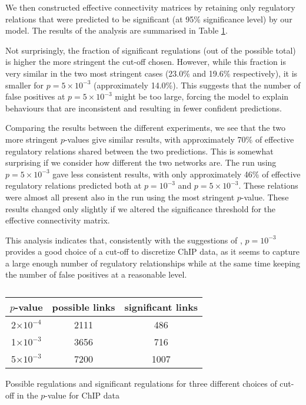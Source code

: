 \documentclass[english]{sheftech}
\begin{document}
We then constructed effective connectivity matrices by retaining only
regulatory relations that were predicted to be significant (at 95\%
significance level) by our model. The results of the analysis are
summarised in Table \ref{pVals}.

Not surprisingly, the fraction of significant regulations (out of
the possible total) is higher the more stringent the cut-off chosen.
However, while this fraction is very similar in the two most stringent
cases (23.0\% and 19.6\% respectively), it is smaller 
for $p=5\times10^{-3}$ (approximately
14.0\%). This suggests that the number of false positives at $p=5\times10^{-3}$
might be too large, forcing the model to explain behaviours that are
inconsistent and resulting in fewer confident predictions.

Comparing the results between the different experiments, we see that the
two more stringent $p$-values give similar results, with approximately
70\% of effective regulatory relations shared between the two predictions. 
This is somewhat surprising if we consider how different the two networks are. 
The run using $p=5\times10^{-3}$ gave less consistent results, with
only approximately 46\% of effective regulatory relations predicted
both at $p=10^{-3}$ and $p=5\times10^{-3}$. These relations were
almost all present also in the run using the most stringent $p$-value. 
These results changed only slightly if we altered the significance
threshold for the effective connectivity matrix.

This analysis indicates that, consistently with the suggestions of
\cite{Lee02}, $p=10^{-3}$ provides a good choice of a cut-off to
discretize ChIP data, as it seems to capture a large enough number
of regulatory relationships while at the same time keeping the number
of false positives at a reasonable level. 
\begin{table}
\small\center\begin{tabular}{|c|c|c|}
\hline 
$p$-value&
possible links&
significant links\tabularnewline
\hline

\hline 
2$\times10^{-4}$&
2111&
486\tabularnewline
\hline 
1$\times10^{-3}$&
3656&
716\tabularnewline
\hline
5$\times10^{-3}$&
7200&
1007\tabularnewline

\hline 
\end{tabular}
\vspace{0.2cm}

\caption\small{Possible regulations and significant regulations for three different 
choices of cut-off in the $p$-value for ChIP data \label{pVals}}
\end{table}
\end{document}
